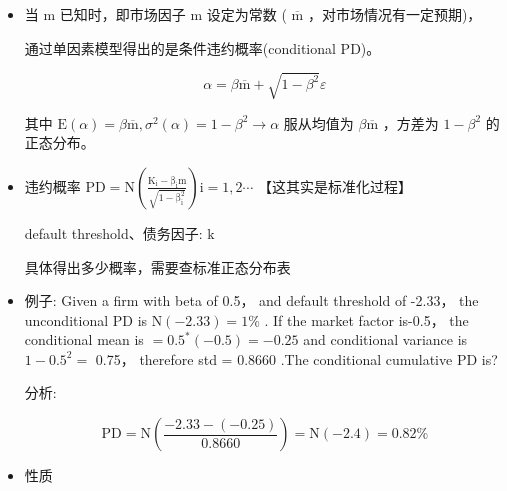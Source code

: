 \begin{itemize}
\item 当 \(\mathrm{m}\) 已知时，即市场因子 \(\mathrm{m}\) 设定为常数 ( \(\overline{\mathrm{m}}\) ，对市场情况有一定预期)，

通过单因素模型得出的是条件违约概率(conditional PD)。

\[
\alpha  = \beta \overline{\mathrm{m}} + \sqrt{1 - {\beta }^{2}}\varepsilon
\]

其中 \(\mathrm{E}\left( \alpha \right)  = \beta \overline{\mathrm{m}},{\sigma }^{2}\left( \alpha \right)  = 1 - {\beta }^{2} \rightarrow  \alpha\) 服从均值为 \(\beta \overline{\mathrm{m}}\) ，方差为 \(1 - {\beta }^{2}\) 的正态分布。

\item 违约概率 \(\mathrm{{PD}} = \mathrm{N}\left( \frac{{\mathrm{K}}_{\mathrm{i}} - {\mathrm{\beta }}_{\mathrm{i}}\mathrm{m}}{\sqrt{1 - {\mathrm{\beta }}_{\mathrm{i}}^{2}}}\right) \mathrm{i} = 1,2\cdots\) 【这其实是标准化过程】

 default threshold、债务因子: \(\mathrm{k}\)

 具体得出多少概率，需要查标准正态分布表

\item 例子: Given a firm with beta of 0.5， and default threshold of -2.33， the unconditional \(\mathrm{{PD}}\) is \(\mathrm{N}\left( {-{2.33}}\right)  = 1\%\) . If the market factor is-0.5， the conditional mean is \(= {0.5}^{ * }\left( {-{0.5}}\right)  =  - {0.25}\) and conditional variance is \(1 - {0.5}^{2} =\) 0.75， therefore std = 0.8660 .The conditional cumulative PD is?

 分析:

\[
\mathrm{{PD}} = \mathrm{N}\left( \frac{-{2.33} - \left( {-{0.25}}\right) }{0.8660}\right)  = \mathrm{N}\left( {-{2.4}}\right)  = {0.82}\%
\]

\item 性质

\begin{center}
\end{center}


\end{itemize}
